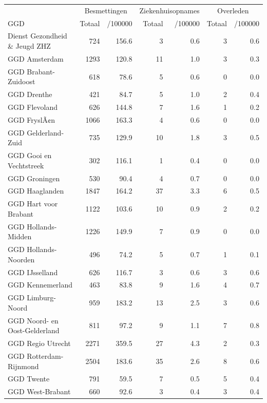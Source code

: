 \documentclass[
  english,
  man,floatsintext]{apa6}
\begin{document}
\begin{table}
\centering\begingroup\fontsize{10}{12}\selectfont

\begin{threeparttable}
\begin{tabular}{lrrrrrr}
\toprule
\multicolumn{1}{c}{ } & \multicolumn{2}{c}{Besmettingen} & \multicolumn{2}{c}{Ziekenhuisopnames} & \multicolumn{2}{c}{Overleden} \\
\cmidrule(l{3pt}r{3pt}){2-3} \cmidrule(l{3pt}r{3pt}){4-5} \cmidrule(l{3pt}r{3pt}){6-7}
GGD & Totaal & /100000 & Totaal & /100000 & Totaal & /100000\\
\midrule
Dienst Gezondheid \& Jeugd ZHZ & 724 & 156.6 & 3 & 0.6 & 3 & 0.6\\
GGD Amsterdam & 1293 & 120.8 & 11 & 1.0 & 3 & 0.3\\
GGD Brabant-Zuidoost & 618 & 78.6 & 5 & 0.6 & 0 & 0.0\\
GGD Drenthe & 421 & 84.7 & 5 & 1.0 & 2 & 0.4\\
GGD Flevoland & 626 & 144.8 & 7 & 1.6 & 1 & 0.2\\
GGD FryslÃ¢n & 1066 & 163.3 & 4 & 0.6 & 0 & 0.0\\
GGD Gelderland-Zuid & 735 & 129.9 & 10 & 1.8 & 3 & 0.5\\
GGD Gooi en Vechtstreek & 302 & 116.1 & 1 & 0.4 & 0 & 0.0\\
GGD Groningen & 530 & 90.4 & 4 & 0.7 & 0 & 0.0\\
GGD Haaglanden & 1847 & 164.2 & 37 & 3.3 & 6 & 0.5\\
GGD Hart voor Brabant & 1122 & 103.6 & 10 & 0.9 & 2 & 0.2\\
GGD Hollands-Midden & 1226 & 149.9 & 7 & 0.9 & 0 & 0.0\\
GGD Hollands-Noorden & 496 & 74.2 & 5 & 0.7 & 1 & 0.1\\
GGD IJsselland & 626 & 116.7 & 3 & 0.6 & 3 & 0.6\\
GGD Kennemerland & 463 & 83.8 & 9 & 1.6 & 4 & 0.7\\
GGD Limburg-Noord & 959 & 183.2 & 13 & 2.5 & 3 & 0.6\\
GGD Noord- en Oost-Gelderland & 811 & 97.2 & 9 & 1.1 & 7 & 0.8\\
GGD Regio Utrecht & 2271 & 359.5 & 27 & 4.3 & 2 & 0.3\\
GGD Rotterdam-Rijnmond & 2504 & 183.6 & 35 & 2.6 & 8 & 0.6\\
GGD Twente & 791 & 59.5 & 7 & 0.5 & 5 & 0.4\\
GGD West-Brabant & 660 & 92.6 & 3 & 0.4 & 3 & 0.4\\

\end{tabular}
\end{threeparttable}
\end{table}
\end{document}
